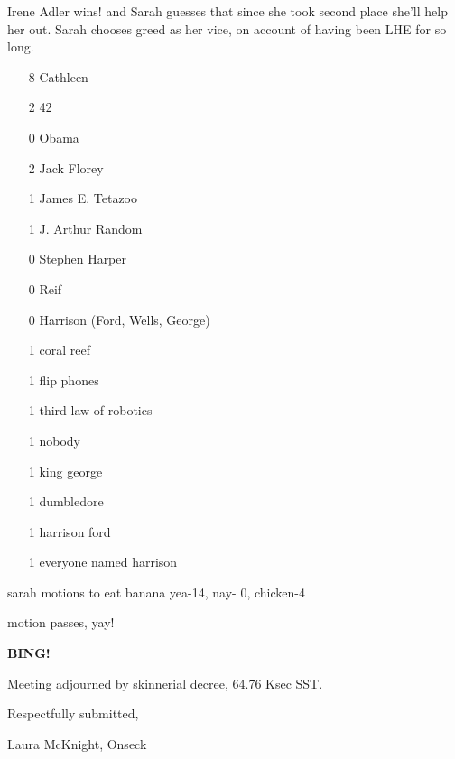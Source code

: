 \documentclass[10pt]{article}
\newcommand{\bing}{{\bf BING!} }
\newcommand{\onseck}{Laura McKnight, Onseck}
\begin{document}
Irene Adler wins! and Sarah guesses that since she took second place she'll help her out. Sarah chooses greed as her vice, on account of having been LHE for so long.



\begin{itemize}

\item[8] Cathleen

\item[2] 42

\item[0] Obama

\item[2] Jack Florey

\item[1] James E. Tetazoo

\item[1] J. Arthur Random

\item[0] Stephen Harper

\item[0] Reif

\item[0] Harrison (Ford, Wells, George)

\item[1] coral reef

\item[1] flip phones

\item[1] third law of robotics

\item[1] nobody

\item[1] king george

\item[1] dumbledore

\item[1] harrison ford

\item[1] everyone named harrison

\end{itemize}



sarah  motions to eat banana yea-14, nay- 0, chicken-4

motion passes, yay!



\bing

\noindent

Meeting adjourned by skinnerial decree, 64.76 Ksec SST.



\vspace{18pt}



\centerline{Respectfully submitted,}

\centerline{\onseck}
\end{document}
